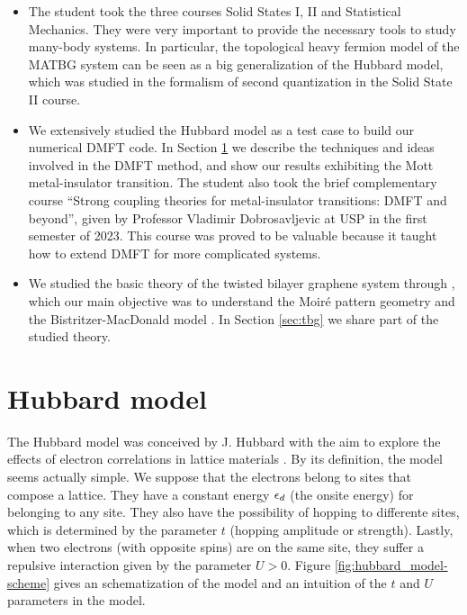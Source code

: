 \documentclass[12pt]{report}
\begin{document}
\begin{itemize}
\item The student took the three courses Solid States I, II and Statistical Mechanics. They were very important to provide the necessary tools to study many-body systems. In particular, the topological heavy fermion model \cite{topoheavyfermion2022} of the MATBG system can be seen as a big generalization of the Hubbard model, which was studied in the formalism of second quantization in the Solid State II course.

\item We extensively studied the Hubbard model \cite{hubbard1963} as a test case to build our numerical DMFT code. In Section \ref{sec:hubbard} we describe the techniques and ideas involved in the DMFT method, and show our results exhibiting the Mott metal-insulator transition. The student also took the brief complementary course ``Strong coupling theories for metal-insulator transitions: DMFT and beyond'', given by Professor Vladimir Dobrosavljevic at USP in the first semester of 2023. This course was proved to be valuable because it taught how to extend DMFT for more complicated systems.

\item We studied the basic theory of the twisted bilayer graphene system through \cite{handbook2019}, which our main objective was to understand the Moiré pattern geometry and the Bistritzer-MacDonald model \cite{macdonald2011}. In Section \ref{sec:tbg} we share part of the studied theory.
\end{itemize}


\section{Hubbard model} \label{sec:hubbard}


The Hubbard model was conceived by J. Hubbard with the aim to explore the effects of electron correlations in lattice materials \cite{hubbard1963}. By its definition, the model seems actually simple. We suppose that the electrons belong to sites that compose a lattice. They have a constant energy $\epsilon_d$ (the onsite energy) for belonging to any site. They also have the possibility of hopping to differente sites, which is determined by the parameter $t$ (hopping amplitude or strength). Lastly, when two electrons (with opposite spins) are on the same site, they suffer a repulsive interaction given by the parameter $U > 0$. Figure \ref{fig:hubbard_model-scheme} gives an schematization of the model and an intuition of the $t$ and $U$ parameters in the model.
\end{document}
